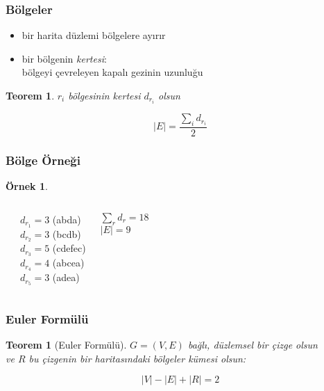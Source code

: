 \documentclass[dvipsnames]{beamer}
\theoremstyle{definition}
\theoremstyle{example}
\newtheorem{ornek}[theorem]{Örnek}
\theoremstyle{plain}
\newtheorem{teorem}[theorem]{Teorem}
\begin{document}
\begin{frame}
  \frametitle{Bölgeler}

  \begin{itemize}
    \item bir harita düzlemi \alert{bölgelere} ayırır
    \item bir bölgenin \emph{kertesi}:\\
      bölgeyi çevreleyen kapalı gezinin uzunluğu
  \end{itemize}

  \pause
  \begin{teorem}
    $r_i$ bölgesinin kertesi $d_{r_i}$ olsun

    \[ |E| = \frac{\sum_i d_{r_i}}{2} \]
  \end{teorem}
\end{frame}

\begin{frame}
  \frametitle{Bölge Örneği}

  \begin{ornek}
    \begin{columns}
      \begin{center}
      \end{center}

      $d_{r_1} = 3$ (abda)\\
      $d_{r_2} = 3$ (bcdb)\\
      $d_{r_3} = 5$ (cdefec)\\
      $d_{r_4} = 4$ (abcea)\\
      $d_{r_5} = 3$ (adea)

      \medskip
      $\sum_r d_r = 18$\\
      $|E| = 9$
    \end{columns}
  \end{ornek}
\end{frame}

\begin{frame}
  \frametitle{Euler Formülü}

  \begin{teorem}[Euler Formülü]
    $G=(V,E)$ bağlı, düzlemsel bir çizge olsun\\
    ve $R$ bu çizgenin bir haritasındaki bölgeler kümesi olsun:

    \[|V| - |E| + |R| = 2\]
  \end{teorem}
\end{frame}
\end{document}
